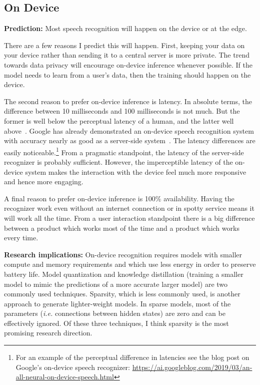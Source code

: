 \subsection{On Device}
\label{sec:on_device}

{\bf Prediction:} Most speech recognition will happen on the device or at the
edge.

There are a few reasons I predict this will happen. First, keeping your data on
your device rather than sending it to a central server is more private. The
trend towards data privacy will encourage on-device inference whenever
possible. If the model needs to learn from a user's data, then the training
should happen on the device.

The second reason to prefer on-device inference is latency. In absolute terms,
the difference between 10 milliseconds and 100 milliseconds is not much.  But
the former is well below the perceptual latency of a human, and the latter well
above~\citep{lago2004quest, levitin2000perception}.  Google has already
demonstrated an on-device speech recognition system with accuracy nearly as
good as a server-side system~\citep{he2019streaming}. The latency differences
are easily noticeable.\footnote{For an example of the perceptual difference in
latencies see the blog post on Google's on-device speech recognizer:
\url{https://ai.googleblog.com/2019/03/an-all-neural-on-device-speech.html}}
From a pragmatic standpoint, the latency of the server-side recognizer is
probably sufficient. However, the imperceptible latency of the on-device system
makes the interaction with the device feel much more responsive and hence more
engaging.

A final reason to prefer on-device inference is 100\% availability. Having the
recognizer work even without an internet connection or in spotty service means
it will work all the time. From a user interaction standpoint there is a big
difference between a product which works most of the time and a product which
works every time.

{\bf Research implications:} On-device recognition requires models with smaller
compute and memory requirements and which use less energy in order to preserve
battery life. Model quantization and knowledge distillation (training a smaller
model to mimic the predictions of a more accurate larger model) are two
commonly used techniques. Sparsity, which is less commonly used, is another
approach to generate lighter-weight models. In sparse models, most of the
parameters (\emph{i.e.} connections between hidden states) are zero and can be
effectively ignored. Of these three techniques, I think sparsity is the
most promising research direction.

